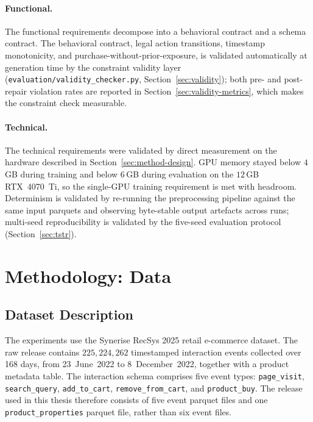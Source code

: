 \documentclass[sigconf,nonacm]{acmart}
\begin{document}
\paragraph{Functional.}
The functional requirements decompose into a behavioral contract and a
schema contract. The behavioral contract, legal action transitions,
timestamp monotonicity, and purchase-without-prior-exposure, is
validated automatically at generation time by the constraint
validity layer (\texttt{evaluation/validity\_checker.py},
Section~\ref{sec:validity}); both pre- and post-repair violation rates
are reported in Section~\ref{sec:validity-metrics}, which makes the
constraint check measurable.

\paragraph{Technical.}
The technical requirements were validated by direct measurement on the
hardware described in Section~\ref{sec:method-design}. GPU memory stayed
below $4$\,GB during training and below $6$\,GB during evaluation on the
$12$\,GB RTX~4070~Ti, so the single-GPU training requirement is met with headroom. Determinism is validated by
re-running the preprocessing pipeline against the same input parquets
and observing byte-stable output artefacts across runs; multi-seed
reproducibility is validated by the five-seed evaluation protocol
(Section~\ref{sec:tstr}).

\section{Methodology: Data}
\label{sec:method-data}

\subsection{Dataset Description}
The experiments use the Synerise RecSys 2025 retail e-commerce dataset. The raw
release contains $225{,}224{,}262$ timestamped interaction events collected over
168 days, from 23~June~2022 to 8~December~2022, together with a product metadata
table. The interaction schema comprises five event types: \texttt{page\_visit},
\texttt{search\_query}, \texttt{add\_to\_cart}, \texttt{remove\_from\_cart}, and
\texttt{product\_buy}. The release used in this thesis therefore consists of five
event parquet files and one \texttt{product\_properties} parquet file, rather
than six event files.
\end{document}
